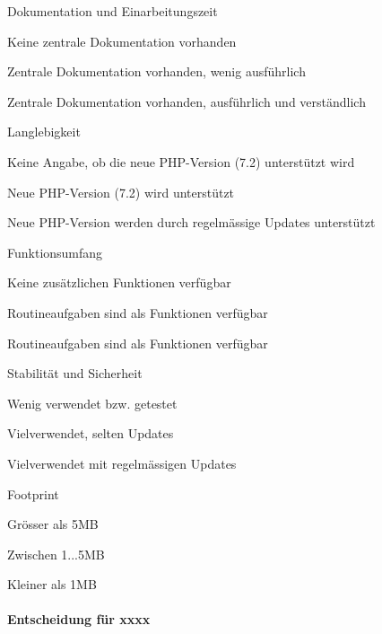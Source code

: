 \begin{itemize*}
\item Dokumentation und Einarbeitungszeit
  \begin{enumerate*}
  \item Keine zentrale Dokumentation vorhanden
  \item Zentrale Dokumentation vorhanden, wenig ausführlich
  \item Zentrale Dokumentation vorhanden, ausführlich und verständlich
  \end{enumerate*}
\item Langlebigkeit
  \begin{enumerate*}
  \item Keine Angabe, ob die neue PHP-Version (7.2) unterstützt wird
  \item Neue PHP-Version (7.2) wird unterstützt
  \item Neue PHP-Version werden durch regelmässige Updates unterstützt
  \end{enumerate*}
\item Funktionsumfang
  \begin{enumerate*}
  \item Keine zusätzlichen Funktionen verfügbar
  \item Routineaufgaben sind als Funktionen verfügbar
  \item Routineaufgaben sind als Funktionen verfügbar
  \end{enumerate*}
\item Stabilität und Sicherheit
  \begin{enumerate*}
  \item Wenig verwendet bzw. getestet
  \item Vielverwendet, selten Updates
  \item Vielverwendet mit regelmässigen Updates
  \end{enumerate*}
\item Footprint
  \begin{enumerate*}
  \item Grösser als 5MB
  \item Zwischen 1...5MB
  \item Kleiner als 1MB
  \end{enumerate*}
\end{itemize*}




\paragraph*{Entscheidung für xxxx}



